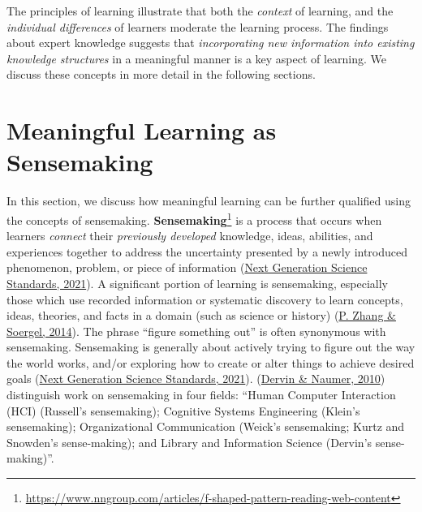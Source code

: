 \documentclass[a4paper, nobind]{templates/ociamthesis}
\begin{document}
The principles of learning illustrate that both the \emph{context} of
learning, and the \emph{individual differences} of learners moderate the
learning process. The findings about expert knowledge suggests that
\emph{incorporating new information into existing knowledge structures} in a
meaningful manner is a key aspect of learning. We discuss these concepts
in more detail in the following sections.

\hypertarget{sec:bg_learn_sensemaking}{%
\section{Meaningful Learning as Sensemaking}\label{sec:bg_learn_sensemaking}}

In this section, we discuss how meaningful learning can be further
qualified using the concepts of sensemaking. \textbf{Sensemaking}\footnote{\url{https://www.nngroup.com/articles/f-shaped-pattern-reading-web-content}} is a
process that occurs when learners \emph{connect} their \emph{previously developed}
knowledge, ideas, abilities, and experiences together to address the
uncertainty presented by a newly introduced phenomenon, problem, or
piece of information (\protect\hyperlink{ref-ngss_sensemaking}{Next Generation Science Standards, 2021}). A significant portion of
learning is sensemaking, especially those which use recorded information
or systematic discovery to learn concepts, ideas, theories, and facts in
a domain (such as science or history) (\protect\hyperlink{ref-zhang2014towards}{P. Zhang \& Soergel, 2014}). The phrase
``figure something out'' is often synonymous with sensemaking. Sensemaking
is generally about actively trying to figure out the way the world
works, and/or exploring how to create or alter things to achieve desired
goals (\protect\hyperlink{ref-ngss_sensemaking}{Next Generation Science Standards, 2021}). (\protect\hyperlink{ref-dervin2010sensemaking}{Dervin \& Naumer, 2010}) distinguish work on
sensemaking in four fields: ``Human Computer Interaction (HCI) (Russell's
sensemaking); Cognitive Systems Engineering (Klein's sensemaking);
Organizational Communication (Weick's sensemaking; Kurtz and Snowden's
sense-making); and Library and Information Science (Dervin's
sense-making)''.
\end{document}
